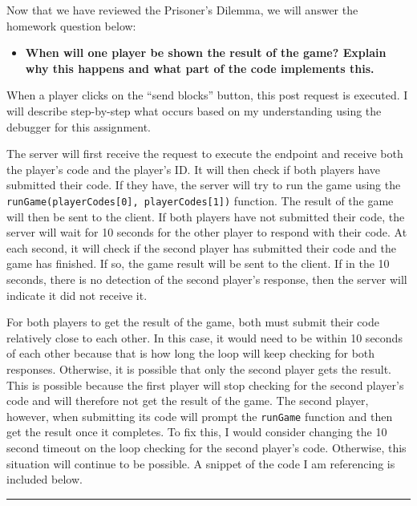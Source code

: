\documentclass{article}
\theoremstyle{theorem}
\theoremstyle{definition}
\theoremstyle{remark}
\begin{document}
Now that we have reviewed the Prisoner's Dilemma, we will answer the homework question below:
\begin{itemize}
  \item[\ding{99}] \textbf{When will one player be shown the result of the game? Explain why this happens and what part of the code implements this.}
\end{itemize}

When a player clicks on the “send blocks” button, this post request is executed. I will describe step-by-step what occurs based on my understanding using the debugger for this assignment. 

The server will first receive the request to execute the endpoint and receive both the player’s code and the player’s ID. It will then check if both players have submitted their code. If they have, the server will try to run the game using the \texttt{runGame(playerCodes[0], playerCodes[1])} function. 
The result of the game will then be sent to the client. If both players have not submitted their code, the server will wait for 10 seconds for the other player to respond with their code. At each second, it will check if the second player has submitted their code and the game has finished. If 
so, the game result will be sent to the client. If in the 10 seconds, there is no detection of the second player’s response, then the server will indicate it did not receive it. 

For both players to get the result of the game, both must submit their code relatively close to each other. In this case, it would need to be within 10 seconds of each other because that is how long the loop will keep checking for both responses. Otherwise, it is possible that only the second 
player gets the result. This is possible because the first player will stop checking for the second player’s code and will therefore not get the result of the game. The second player, however, when submitting its code will prompt the \texttt{runGame} function and then get the result once it completes. 
To fix this, I would consider changing the 10 second timeout on the loop checking for the second player’s code. Otherwise, this situation will continue to be possible. A snippet of the code I am referencing is included below. 

\noindent
{\color{gray} \rule{\linewidth}{0.05mm}}
\end{document}

